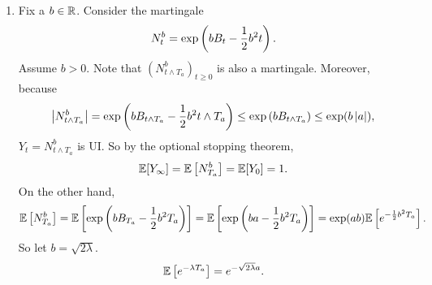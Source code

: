 \begin{exam}
\begin{enumerate}[label=(\arabic{*})]
        \item Fix a $b\in \mathbb{R}$. Consider the martingale
        \begin{equation*}
            N^b_t = \exp \left(bB_t - \frac{1}{2}b^2 t\right).
        \end{equation*}
        Assume $b > 0$. Note that $(N^b_{t \wedge T_a})_{t \geq 0}$ is also a martingale. Moreover, because
        \begin{equation*}
            \left\lvert N^b_{t \wedge T_a}\right\lvert = \exp\left(bB_{t \wedge T_a} - \frac{1}{2}b^2 t \wedge T_a\right) \leq \exp\left(bB_{t \wedge T_a}\right) \leq \exp(b\left\lvert a\right\lvert),
        \end{equation*}
        $Y_t = N^b_{t \wedge T_a}$ is UI. So by the optional stopping theorem,
        \begin{equation*}
            \mathbb{E}[Y_{\infty}] = \mathbb{E}\left[N^b_{T_a}\right] = \mathbb{E}[Y_0] = 1.
        \end{equation*}
        On the other hand,
        \begin{equation*}
            \mathbb{E}\left[N^b_{T_a}\right] = \mathbb{E}\left[\exp\left(bB_{T_a} - \frac{1}{2}b^2 T_a\right)\right] = \mathbb{E}\left[\exp\left(ba - \frac{1}{2}b^2 T_a\right)\right] = \exp(ab)\mathbb{E}\left[e^{-\frac{1}{2}b^2T_a}\right].
        \end{equation*}
        So let $b = \sqrt{2\lambda}$.
        \begin{equation*}
            \mathbb{E}\left[e^{-\lambda T_a}\right] = e^{-\sqrt{2\lambda}a}.
        \end{equation*}
    \end{enumerate}
\end{exam}

